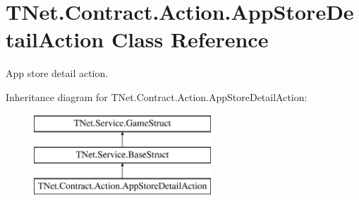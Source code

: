 \hypertarget{class_t_net_1_1_contract_1_1_action_1_1_app_store_detail_action}{}\section{T\+Net.\+Contract.\+Action.\+App\+Store\+Detail\+Action Class Reference}
\label{class_t_net_1_1_contract_1_1_action_1_1_app_store_detail_action}


App store detail action.  


Inheritance diagram for T\+Net.\+Contract.\+Action.\+App\+Store\+Detail\+Action\+:\begin{figure}[H]
\begin{center}
\leavevmode
\includegraphics[height=3.000000cm]{class_t_net_1_1_contract_1_1_action_1_1_app_store_detail_action}
\end{center}
\end{figure}
